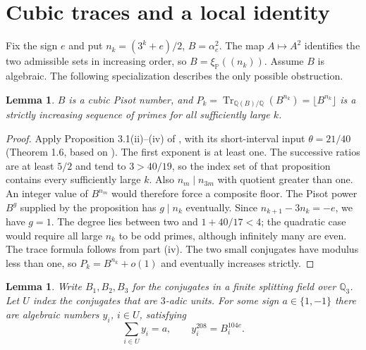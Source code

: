 \documentclass[11pt]{article}
\newtheorem{lemma}[theorem]{Lemma}
\newcommand{\PP}{\mathbb P}
\newcommand{\Tr}{\operatorname{Tr}}
\newcommand{\floor}[1]{\lfloor #1\rfloor}
\begin{document}
\section{Cubic traces and a local identity}
Fix the sign $e$ and put $n_k=(3^k+e)/2$, $B=\alpha_e^2$. The map $A\mapsto A^2$ identifies the two admissible sets in increasing order, so $B=\xi_{\PP}((n_k))$. Assume $B$ is algebraic. The following specialization describes the only possible obstruction.
\begin{lemma}\label{lem:red}
$B$ is a cubic Pisot number, and $P_k=\Tr_{\mathbb Q(B)/\mathbb Q}(B^{n_k})=\floor{B^{n_k}}$ is a strictly increasing sequence of primes for all sufficiently large $k$.
\end{lemma}
\begin{proof}
Apply Proposition 3.1(ii)--(iv) of \cite{saito}, with its short-interval input $\theta=21/40$ (Theorem 1.6, based on \cite{bhp}). The first exponent is at least one. The successive ratios are at least $5/2$ and tend to $3>40/19$, so the index set of that proposition contains every sufficiently large $k$. Also $n_m\mid n_{3m}$ with quotient greater than one. An integer value of $B^{n_m}$ would therefore force a composite floor. The Pisot power $B^g$ supplied by the proposition has $g\mid n_k$ eventually. Since $n_{k+1}-3n_k=-e$, we have $g=1$. The degree lies between two and $1+40/17<4$; the quadratic case would require all large $n_k$ to be odd primes, although infinitely many are even. The trace formula follows from part (iv). The two small conjugates have modulus less than one, so $P_k=B^{n_k}+o(1)$ and eventually increases strictly.
\end{proof}
\begin{lemma}\label{lem:local}
Write $B_1,B_2,B_3$ for the conjugates in a finite splitting field over $\mathbb Q_3$. Let $U$ index the conjugates that are $3$-adic units. For some sign $a\in\{1,-1\}$ there are algebraic numbers $y_i$, $i\in U$, satisfying
\[
  \sum_{i\in U}y_i=a,\qquad y_i^{208}=B_i^{104e}.
\]
\end{lemma}
\end{document}

